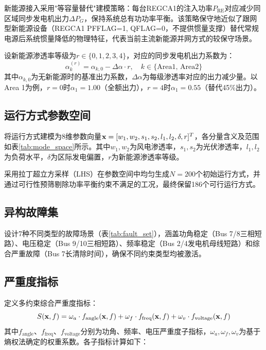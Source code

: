 新能源接入采用"等容量替代"建模策略：每台REGCA1的注入功率$P_{\text{RE}}$对应减少同区域同步发电机出力$\Delta P_G$，保持系统总有功功率平衡。该策略保守地近似了跟网型新能源设备（REGCA1 PFFLAG=1, QFLAG=0，不提供惯量支撑）替代常规电源后系统惯量降低的物理特征\cite{hu2023inertia_re}，代表当前主流新能源并网方式的较保守场景。

设新能源渗透率等级为$r \in \{0, 1, 2, 3, 4\}$，对应的同步发电机出力系数为：
\begin{equation}
    \alpha_k^{(r)} = \alpha_{k,0} - \Delta\alpha \cdot r, \quad k \in \{\text{Area1, Area2}\}
    \label{eq:gen_factor}
\end{equation}
其中$\alpha_{k,0}$为无新能源时的基准出力系数，$\Delta\alpha$为每级渗透率对应的出力减少量。以Area 1为例，$r=0$时$\alpha_1 = 1.00$（全额出力），$r=4$时$\alpha_1 = 0.55$（替代45\%出力）。

\subsection{运行方式参数空间}

将运行方式建模为8维参数向量$\mathbf{x} = [w_1, w_2, s_1, s_2, l_1, l_2, \delta, r]^T$，各分量含义及范围如表\ref{tab:mode_space}所示。其中$w_1, w_2$为风电渗透率，$s_1, s_2$为光伏渗透率，$l_1, l_2$为负荷水平，$\delta$为区际发电偏置，$r$为新能源渗透率等级。



采用拉丁超立方采样（LHS）\cite{mckay1979lhs}在参数空间中均匀生成$N = 200$个初始运行方式，并通过可行性预筛剔除功率平衡约束不满足的工况，最终保留186个可行运行方式。

\subsection{异构故障集}

设计7种不同类型的故障场景（表\ref{tab:fault_set}），涵盖功角稳定（Bus 7/8三相短路）、电压稳定（Bus 9/10三相短路）、频率稳定（Bus 2/4发电机母线短路）和综合严重故障（Bus 7长清除时间），确保不同约束类型均被激活。



\subsection{严重度指标}

定义多约束综合严重度指标：
\begin{equation}
    S(\mathbf{x}, f) = \omega_a \cdot f_{\text{angle}}(\mathbf{x}, f) + \omega_f \cdot f_{\text{freq}}(\mathbf{x}, f) + \omega_v \cdot f_{\text{voltage}}(\mathbf{x}, f)
    \label{eq:severity}
\end{equation}
其中$f_{\text{angle}}$、$f_{\text{freq}}$、$f_{\text{voltage}}$分别为功角、频率、电压严重度子指标，$\omega_a, \omega_f, \omega_v$为基于熵权法\cite{liu2018fast_scanning}确定的权重系数。各子指标计算如下：

